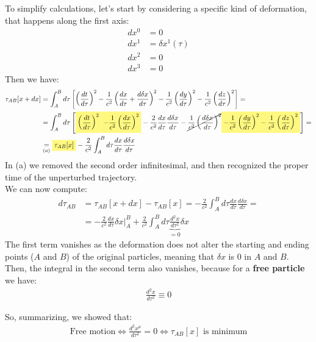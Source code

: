 \documentclass[../template.tex]{subfiles}
\begin{document}
To simplify calculations, let's start by considering a specific kind of deformation, that happens along the first axis:
\begin{align*}
    dx^0 &= 0 \\
    dx^1 &= \delta x^1(\tau) \\
    dx^2 &= 0 \\
    dx^3 &= 0 
\end{align*}
Then we have:
\begin{align*}
    \tau_{AB} [x+dx] &= \int_{A}^{B} d \tau \left[\left(\frac{dt}{d \tau} \right)^2 
    -\frac{1}{c^2} \left(\frac{dx}{d \tau} + \frac{d \delta x}{d \tau}  \right)^2
    -\frac{1}{c^2} \left(\frac{dy}{d \tau} \right)^2
    -\frac{1}{c^2} \left(\frac{dz}{d \tau} \right)^2
    \right] =\\
    &= \int_{A}^{B} d \tau \left[\hlc{Yellow}{\left( \frac{dt}{d \tau} \right)^2 
    }\hlc{Yellow}{-\frac{1}{c^2} \left(\frac{dx}{d \tau} \right)^2 }- \frac{2}{c^2}\frac{dx}{d \tau} \frac{d \delta x}{d \tau}
    -\cancel{\frac{1}{c^2}\left(\frac{d \delta x}{d \tau} \right)^2 
    }\hlc{Yellow}{-\frac{1}{c^2} \left(\frac{dy}{d \tau} \right)^2
    -\frac{1}{c^2} \left(\frac{dz}{d \tau} \right)^2}
    \right] = \\
    &\underset{(a)}{=}  \hlc{Yellow}{\tau_{AB}[x]} - \frac{2}{c^2} \int_{A}^{B} d \tau \frac{dx}{d \tau} \frac{d \delta x}{d \tau}    \\
\end{align*}
In (a) we removed the second order infinitesimal, and then recognized the proper time of the unperturbed trajectory.\\
We can now compute:
\begin{align*}
    d \tau_{AB} &= \tau_{AB}[x + dx] - \tau_{AB}[x] = - \frac{2}{c^2} \int_{A}^{B} d \tau \frac{dx}{d \tau} \frac{d \delta x}{d \tau} =\\
    &= -\frac{2}{c^2} \frac{dx}{d \tau} \delta x\Big|_A^B + \frac{2}{c^2} \int_{A}^{B} d \tau \underbrace{\frac{d^2x}{d \tau^2}}_{= 0} \delta x  
\end{align*}
The first term vanishes as the deformation does not alter the starting and ending points ($A$ and $B$) of the original particles, meaning that $\delta x$ is $0$ in $A$ and $B$. Then, the integral in the second term also vanishes, because for a \textbf{free particle} we have:
\begin{align*}
    \frac{d^2 x}{d \tau^2} \equiv 0 
\end{align*}    

So, summarizing, we showed that:
\begin{align*}
    \text{Free motion} \Leftrightarrow \frac{d^2 x^\mu}{d \tau^2} = 0 \Leftrightarrow \tau_{AB}[x] \text{ is minimum} 
\end{align*}
\end{document}
